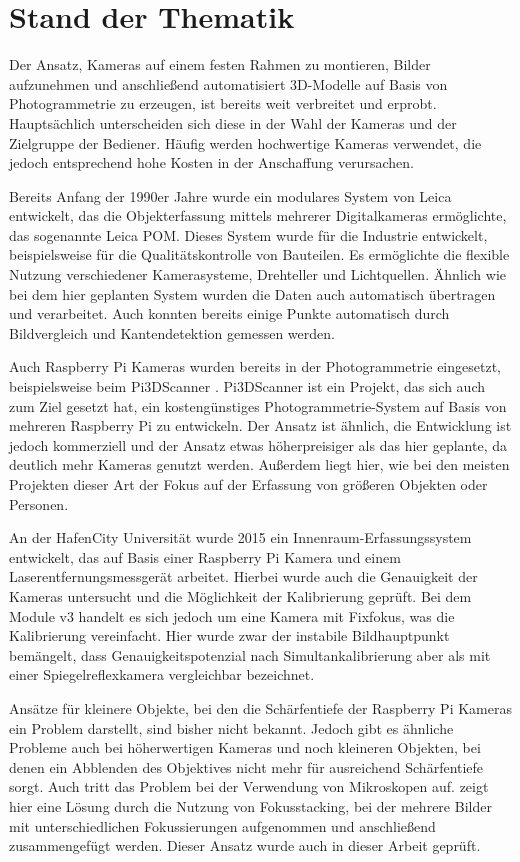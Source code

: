 \documentclass[./00PhotoBox]{subfiles}
\begin{document}
\section{Stand der Thematik}
Der Ansatz, Kameras auf einem festen Rahmen zu montieren, Bilder aufzunehmen und anschließend automatisiert 3D-Modelle auf Basis von Photogrammetrie zu erzeugen, ist bereits weit verbreitet und erprobt. Hauptsächlich unterscheiden sich diese in der Wahl der Kameras und der Zielgruppe der Bediener. Häufig werden hochwertige Kameras verwendet, die jedoch entsprechend hohe Kosten in der Anschaffung verursachen.

Bereits Anfang der 1990er Jahre wurde ein modulares System von Leica entwickelt, das die Objekterfassung mittels mehrerer Digitalkameras ermöglichte, das sogenannte Leica POM.  Dieses System wurde für die Industrie entwickelt, beispielsweise für die Qualitätskontrolle von Bauteilen. Es ermöglichte die flexible Nutzung verschiedener Kamerasysteme, Drehteller und Lichtquellen. Ähnlich wie bei dem hier geplanten System wurden die Daten auch automatisch übertragen und verarbeitet. Auch konnten bereits einige Punkte automatisch durch Bildvergleich und Kantendetektion gemessen werden.
\citep{leica_pom_concept}

Auch Raspberry Pi Kameras wurden bereits in der Photogrammetrie eingesetzt, beispielsweise beim Pi3DScanner \citep{pi3dscanner}. Pi3DScanner ist ein Projekt, das sich auch zum Ziel gesetzt hat, ein kostengünstiges Photo\-gram\-metrie-System auf Basis von mehreren Raspberry Pi zu entwickeln. Der Ansatz ist ähnlich, die Entwicklung ist jedoch kommerziell und der Ansatz etwas höherpreisiger als das hier geplante, da deutlich mehr Kameras genutzt werden. Außerdem liegt hier, wie bei den meisten Projekten dieser Art der Fokus auf der Erfassung von größeren Objekten oder Personen.
\citep{pi3dscanner}

An der HafenCity Universität wurde 2015 ein Innenraum-Erfassungssystem entwickelt, das auf Basis einer Raspberry Pi Kamera und einem Laserentfernungsmessgerät arbeitet. Hierbei wurde auch die Genauigkeit der Kameras untersucht und die Möglichkeit der Kalibrierung geprüft. Bei dem Module v3 handelt es sich jedoch um eine Kamera mit Fixfokus, was die Kalibrierung vereinfacht. Hier wurde zwar der instabile Bildhauptpunkt bemängelt, dass Genauigkeitspotenzial nach Simultankalibrierung aber als mit einer Spiegelreflexkamera vergleichbar bezeichnet.
\citep{3d_raspi_laserscanner}

Ansätze für kleinere Objekte, bei den die Schärfentiefe der Raspberry Pi Kameras ein Problem darstellt, sind bisher nicht bekannt. Jedoch gibt es ähnliche Probleme auch bei höherwertigen Kameras und noch kleineren Objekten, bei denen ein Abblenden des Objektives nicht mehr für ausreichend Schärfentiefe sorgt. Auch tritt das Problem bei der Verwendung von Mikroskopen auf. \cite{focusstack_sfm} zeigt hier eine Lösung durch die Nutzung von Fokusstacking, bei der mehrere Bilder mit unterschiedlichen Fokussierungen aufgenommen und anschließend zusammengefügt werden. Dieser Ansatz wurde auch in dieser Arbeit geprüft.




\biblio
\end{document}
